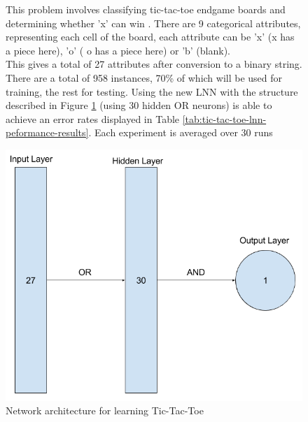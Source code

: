 \begin{figure}[H]
	\centering
	\begin{minipage}[t]{0.5\textwidth}
		\vspace{0px}
		This problem involves classifying tic-tac-toe endgame boards and determining whether 'x' can win . There are 9 categorical attributes, representing each cell of the board, each attribute can be 'x' (x has a piece here), 'o' ( o has a piece here) or 'b' (blank).\\
	
		This gives a total of 27 attributes after conversion to a binary string. There are a total of 958 instances, 70\% of which will be used for training, the rest for testing.  Using the new LNN with the structure described in Figure \ref{fig:tic-tac-toe-net} (using 30 hidden OR neurons) is able to achieve an error rates displayed in Table \ref{tab:tic-tac-toe-lnn-peformance-results}. Each experiment is averaged over 30 runs
	\end{minipage}
	\hspace{1px}
	\begin{minipage}[t]{0.48\textwidth}
		\vspace{0px}
		\includegraphics[width=\textwidth]{Tic-Tac-Toe-Net.png}
		\caption{Network architecture for learning Tic-Tac-Toe}
		\label{fig:tic-tac-toe-net}
	\end{minipage}
	\hfill
\end{figure}



